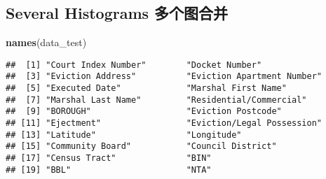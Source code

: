 \documentclass[
]{article}
\newenvironment{Shaded}{\begin{snugshade}}{\end{snugshade}}
\newcommand{\FunctionTok}[1]{\textcolor[rgb]{0.13,0.29,0.53}{\textbf{#1}}}
\newcommand{\NormalTok}[1]{#1}
\begin{document}
\hypertarget{several-histograms-ux591aux4e2aux56feux5408ux5e76}{%
\subsection{Several Histograms
多个图合并}\label{several-histograms-ux591aux4e2aux56feux5408ux5e76}}

\begin{Shaded}
\begin{Highlighting}[]
\FunctionTok{names}\NormalTok{(data\_test)}
\end{Highlighting}
\end{Shaded}

\begin{verbatim}
##  [1] "Court Index Number"        "Docket Number"            
##  [3] "Eviction Address"          "Eviction Apartment Number"
##  [5] "Executed Date"             "Marshal First Name"       
##  [7] "Marshal Last Name"         "Residential/Commercial"   
##  [9] "BOROUGH"                   "Eviction Postcode"        
## [11] "Ejectment"                 "Eviction/Legal Possession"
## [13] "Latitude"                  "Longitude"                
## [15] "Community Board"           "Council District"         
## [17] "Census Tract"              "BIN"                      
## [19] "BBL"                       "NTA"
\end{verbatim}
\end{document}
